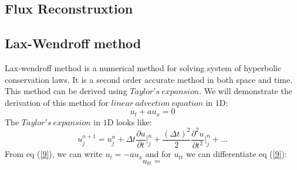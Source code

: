 \subsection{Flux Reconstruxtion}


\subsection{Lax-Wendroff method}
Lax-wendroff method is a numerical method for solving system of hyperbolic conservation laws. It is a second order accurate method in both space and time. This method can be derived using
$Taylor's~expansion.$ We will demonstrate the derivation of this method for $linear~advection~equation$ in $1$D:
\begin{equation} \label{9}
    u_t + au_x = 0
\end{equation}
The $Taylor's~expansion$ in $1$D looks like:
\begin{equation}
    u_j^{n+1} = u_j^n + \Delta t \frac{\partial u}{\partial t}\bigg\vert_j^n + \frac{(\Delta t)^2}{2}\frac{\partial^2 u}{\partial t^2}\bigg\vert_j^n + \dots
\end{equation}
From eq (\ref{9}), we can write $ u_t = -au_x$ and for $u_{tt}$ we can differentiate eq (\ref{9}):
\begin{equation}
    u_{tt} = 
\end{equation}
